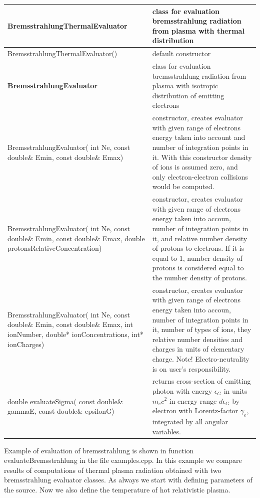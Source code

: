 \begin{small}
	\label{vremsstrahlung}
	\begin{xtabular}{|p{0.5\textwidth}|p{0.5\textwidth}|}  
		\hline
		\textbf{BremsstrahlungThermalEvaluator} & class for evaluation bremsstrahlung radiation from plasma with thermal distribution\\
		\hline
		BremsstrahlungThermalEvaluator() & default constructor\\
		\hline
		\textbf{BremsstrahlungEvaluator} & class for evaluation bremsstrahlung radiation from plasma with isotropic distribution of emitting electrons\\
		\hline
		BremsstrahlungEvaluator( int Ne, const double\& Emin, const double\& Emax) & constructor, creates evaluator with given range of electrons energy taken into account and number of integration points in it. With this constructor density of ions is assumed zero, and only electron-electron collisions would be computed.\\
		\hline
		BremsstrahlungEvaluator( int Ne, const double\& Emin, const double\& Emax, double protonsRelativeConcentration) & constructor, creates evaluator with given range of electrons energy taken into accoun, number of integration points in it, and relative number density of protons to electrons. If it is equal to 1, number density of protons is considered equal to the number density of protons.\\
		\hline
		BremsstrahlungEvaluator( int Ne, const double\& Emin, const double\& Emax, int ionNumber, double* ionConcentrations, int* ionCharges) & constructor, creates evaluator with given range of electrons energy taken into accoun, number of integration points in it, number of types of ions, they relative number densities and charges in units of elementary charge. Note! Electro-neutrality is on user's responsibility.\\
		\hline
		double evaluateSigma( const double\& gammaE, const double\& epsilonG) & returns cross-section of emitting photon with energy $\epsilon_G$ in units $m_e c^2$ in energy range $d\epsilon_G$ by electron with Lorentz-factor $\gamma_e$, integrated by all angular variables.\\
		\hline
	\end{xtabular}
\end{small}

Example of evaluation of bremsstrahlung is shown in function  evaluateBremsstrahlung in the file examples.cpp. In this example we compare results of computations of thermal plasma radiation obtained with two bremsstrahlung evaluator classes. As always we start with defining parameters of the source. Now we also define the temperature of hot relativistic plasma.

